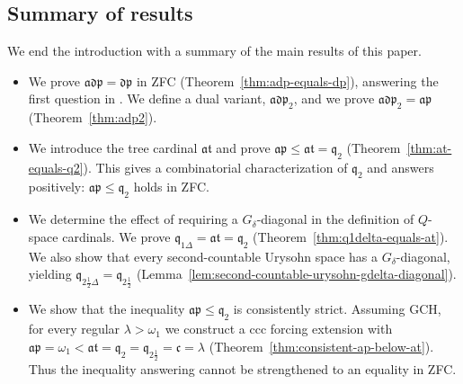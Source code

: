 \subsection*{Summary of results}

We end the introduction with a summary of the main results of this paper.

\begin{itemize}
    \item We prove $\mathfrak{adp}=\mathfrak{dp}$ in ZFC (Theorem~\ref{thm:adp-equals-dp}), answering the first question in \cite[Problem~12]{banakh2023q}. We define a dual variant, $\mathfrak{adp}_2$, and we prove $\mathfrak{adp}_2=\mathfrak{ap}$ (Theorem~\ref{thm:adp2}).

    \item We introduce the tree cardinal $\mathfrak{at}$ and prove $\mathfrak{ap}\leq\mathfrak{at}=\mathfrak q_2$ (Theorem~\ref{thm:at-equals-q2}). This gives a combinatorial characterization of $\mathfrak q_2$ and answers \cite[Problem~11(1)]{banakh2023q} positively: $\mathfrak{ap}\leq\mathfrak q_2$ holds in ZFC.

    \item We determine the effect of requiring a $G_\delta$-diagonal in the definition of $Q$-space cardinals. We prove $\mathfrak q_{1\Delta}=\mathfrak{at}=\mathfrak q_2$ (Theorem~\ref{thm:q1delta-equals-at}). We also show that every second-countable Urysohn space has a $G_\delta$-diagonal, yielding $\mathfrak q_{2\frac{1}{2}\Delta}=\mathfrak q_{2\frac{1}{2}}$ (Lemma~\ref{lem:second-countable-urysohn-gdelta-diagonal}).

    \item We show that the inequality $\mathfrak{ap}\leq\mathfrak q_2$ is consistently strict. Assuming GCH, for every regular $\lambda>\omega_1$ we construct a ccc forcing extension with $\mathfrak{ap}=\omega_1<\mathfrak{at}=\mathfrak q_2=\mathfrak q_{2\frac{1}{2}}=\mathfrak c=\lambda$ (Theorem~\ref{thm:consistent-ap-below-at}). Thus the inequality answering \cite[Problem~11(1)]{banakh2023q} cannot be strengthened to an equality in ZFC.
\end{itemize}
